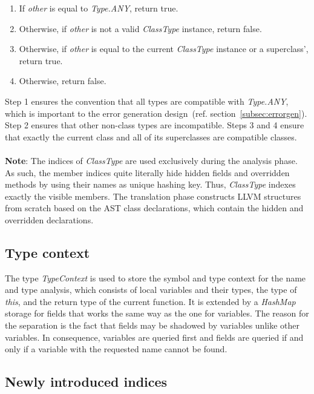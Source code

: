 \documentclass[]{tukportfolio}
\begin{document}
\begin{enumerate}
  \item If \textit{other} is equal to \textit{Type.ANY}, return true.
  \item Otherwise, if \textit{other} is not a valid \textit{ClassType} instance, return false.
  \item Otherwise, if \textit{other} is equal to the current \textit{ClassType} instance or a superclass', return true.
  \item Otherwise, return false.
\end{enumerate}

Step 1 ensures the convention that all types are compatible with \textit{Type.ANY}, which is important to the error generation design~(ref. section~\ref{subsec:errorgen}). Step 2 ensures that other non-class types are incompatible. Steps 3 and 4 ensure that exactly the current class and all of its superclasses are compatible classes.
\\
\\
\textbf{Note}: The indices of \textit{ClassType} are used exclusively during the analysis phase. As such, the member indices quite literally hide hidden fields and overridden methods by using their names as unique hashing key. Thus, \textit{ClassType} indexes exactly the visible members. The translation phase constructs LLVM structures from scratch based on the AST class declarations, which contain the hidden and overridden declarations.

\subsection{Type context}

The type \textit{TypeContext} is used to store the symbol and type context for the name and type analysis, which consists of local variables and their types, the type of \textit{this}, and the return type of the current function. It is extended by a \textit{HashMap} storage for fields that works the same way as the one for variables. The reason for the separation is the fact that fields may be shadowed by variables unlike other variables. In consequence, variables are queried first and fields are queried if and only if a variable with the requested name cannot be found.

\subsection{Newly introduced indices}
\end{document}
